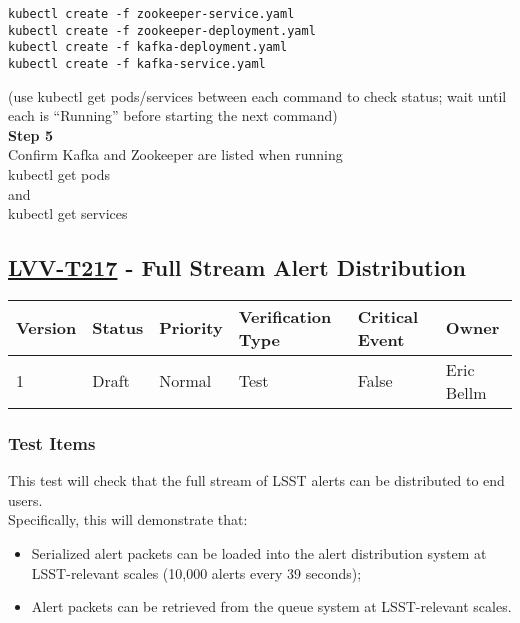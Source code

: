 \begin{verbatim}
kubectl create -f zookeeper-service.yaml
kubectl create -f zookeeper-deployment.yaml
kubectl create -f kafka-deployment.yaml
kubectl create -f kafka-service.yaml
\end{verbatim}

(use kubectl get pods/services between each command to check status;
wait until each is ``Running'' before starting the next
command)\\[4\baselineskip]\textbf{Step 5}\\
Confirm Kafka and Zookeeper are listed when
running\\[2\baselineskip]kubectl get
pods\\[2\baselineskip]and\\[2\baselineskip]kubectl get
services\\[2\baselineskip]

\hypertarget{lvv-t217---full-stream-alert-distribution}{\subsection{\texorpdfstring{\href{https://jira.lsstcorp.org/secure/Tests.jspa\#/testCase/LVV-T217}{LVV-T217}
- Full Stream Alert
Distribution}{LVV-T217 - Full Stream Alert Distribution}}\label{lvv-t217---full-stream-alert-distribution}}

\begin{longtable}[]{@{}llllll@{}}
\toprule
Version & Status & Priority & Verification Type & Critical Event &
Owner\tabularnewline
\midrule
\endhead
1 & Draft & Normal & Test & False & Eric Bellm\tabularnewline
\bottomrule
\end{longtable}

\subsubsection{Test Items}\label{test-items-7}

This test will check that the full stream of LSST alerts can be
distributed to end users.\\[2\baselineskip]Specifically, this will
demonstrate that:

\begin{itemize}
\tightlist
\item
  Serialized alert packets can be loaded into the alert distribution
  system at LSST-relevant scales (10,000 alerts every 39 seconds);
\item
  Alert packets can be retrieved from the queue system at LSST-relevant
  scales.
\end{itemize}

